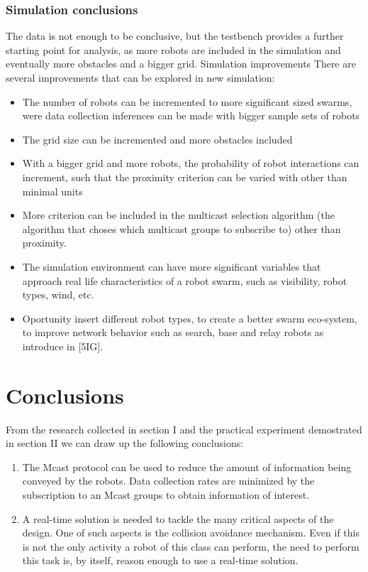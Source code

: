 \documentclass[journal]{IEEEtran}
\begin{document}
\begin{itemize}
\subsubsection{Simulation conclusions}
The data is not enough to be conclusive, but the testbench provides a further starting point for analysis, as more robots are included in the simulation and eventually more obstacles and a bigger grid. 
Simulation improvements
There are several improvements that can be explored in new simulation:
\begin{itemize}
\item	The number of robots can be incremented to more significant sized swarms, were data collection inferences can be made with bigger sample sets of robots
\item	The grid size can be incremented and more obstacles included
\item	With a bigger grid and more robots, the probability of robot interactions can increment, such that the proximity criterion can be varied with other than minimal units
\item	More criterion can be included in the multicast selection algorithm (the algorithm that choses which multicast groups to subscribe to) other than proximity. 
\item	The simulation environment can have more significant variables that approach real life characteristics of a robot swarm, such as visibility, robot types, wind, etc.
\item	Oportunity insert different robot types, to create a better swarm eco-system, to improve network behavior such as search, base and relay robots as introduce in [5IG].
\end{itemize}

\section{Conclusions}

From the research collected in section I and the practical experiment demostrated in section II we can draw up the following conclusions:


\begin{enumerate}
\item The Mcast protocol can be used to reduce the amount of information being conveyed by the robots. Data collection rates are minimized by the subscription to an Mcast groups to obtain information of interest.

\item A real-time solution is needed to tackle the many critical aspects of the design. One of such aspects is the collision avoidance mechanism. Even if this is not the only activity a robot of this class can perform, the need to perform this task is, by itself, reason enough to use a real-time solution.


\end{enumerate}
\end{itemize}
\end{document}
